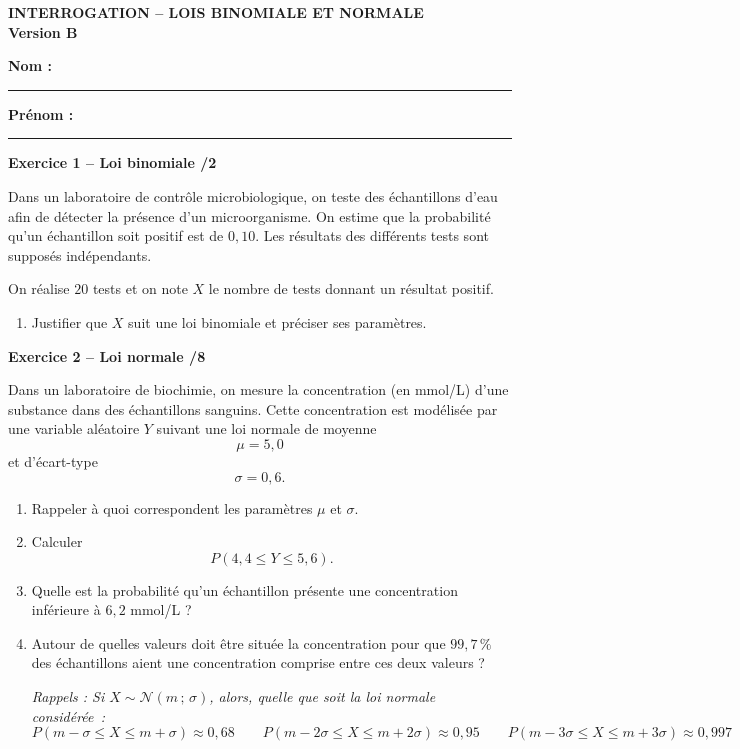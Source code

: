 \documentclass[10pt,a4paper]{article}
\newcommand{\version}[1]{
    \begin{center}
        \textbf{\large INTERROGATION -- LOIS BINOMIALE ET NORMALE}\\
        \textbf{Version #1}
    \end{center}

    \vspace{-0.1cm}

    \textbf{Nom :} \rule{5cm}{0.4pt}
    \hfill
    \textbf{Prénom :} \rule{4cm}{0.4pt}

    \vspace{0.2cm}
}
\begin{document}
\vfill


\version{B}

\textbf{Exercice 1 -- Loi binomiale \hfill /2}

Dans un laboratoire de contrôle microbiologique, on teste des
échantillons d'eau afin de détecter la présence d'un microorganisme.
On estime que la probabilité qu'un échantillon soit positif est de
$0,10$. Les résultats des différents tests sont supposés indépendants.

On réalise $20$ tests et on note $X$ le nombre de tests donnant un
résultat positif.

\begin{enumerate}[label=\arabic*.]
    \item Justifier que $X$ suit une loi binomiale et préciser ses paramètres.
\end{enumerate}



\textbf{Exercice 2 -- Loi normale \hfill /8}

Dans un laboratoire de biochimie, on mesure la concentration (en
mmol/L) d'une substance dans des échantillons sanguins. Cette
concentration est modélisée par une variable aléatoire $Y$ suivant
une loi normale de moyenne
\[
\mu=5,0
\]
et d'écart-type
\[
\sigma=0,6.
\]

\begin{enumerate}[label=\arabic*.]
    \item Rappeler à quoi correspondent les paramètres $\mu$ et $\sigma$.

    \item Calculer
    \[
    P(4,4\leq Y\leq5,6).
    \]

    \item Quelle est la probabilité qu'un échantillon présente une
    concentration inférieure à $6,2$ mmol/L ?

    \item Autour de quelles valeurs doit être située la concentration
    pour que $99,7\,\%$ des échantillons aient une concentration comprise
    entre ces deux valeurs ?

        \textit{Rappels : Si $X \sim \mathcal{N}(m\,;\,\sigma)$, alors, quelle que soit la loi normale considérée~:
$$P(m-\sigma \leqslant X \leqslant m+\sigma) \approx 0{,}68 \qquad P(m-2\sigma \leqslant X \leqslant m+2\sigma) \approx 0{,}95 \qquad P(m-3\sigma \leqslant X \leqslant m+3\sigma) \approx 0{,}997$$} 
\end{enumerate}
\end{document}
